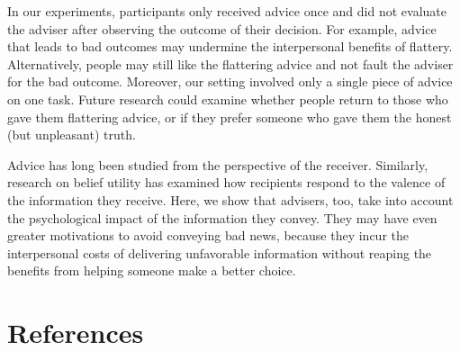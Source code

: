 \documentclass[
  man,
  floatsintext,
  longtable,
  nolmodern,
  notxfonts,
  notimes,
  colorlinks=true,linkcolor=blue,citecolor=blue,urlcolor=blue]{apa7}
\begin{document}
In our experiments, participants only received advice once and did not
evaluate the adviser after observing the outcome of their decision. For
example, advice that leads to bad outcomes may undermine the
interpersonal benefits of flattery. Alternatively, people may still like
the flattering advice and not fault the adviser for the bad outcome.
Moreover, our setting involved only a single piece of advice on one
task. Future research could examine whether people return to those who
gave them flattering advice, or if they prefer someone who gave them the
honest (but unpleasant) truth.

Advice has long been studied from the perspective of the receiver.
Similarly, research on belief utility has examined how recipients
respond to the valence of the information they receive. Here, we show
that advisers, too, take into account the psychological impact of the
information they convey. They may have even greater motivations to avoid
conveying bad news, because they incur the interpersonal costs of
delivering unfavorable information without reaping the benefits from
helping someone make a better choice.

\section{References}\label{references}
\end{document}
